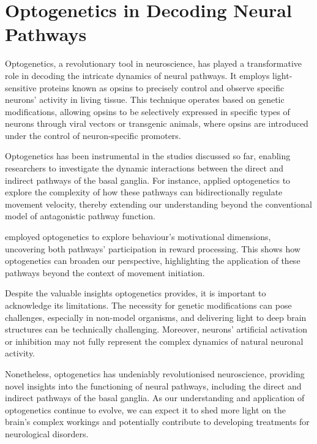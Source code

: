 \documentclass[10pt]{article}
\begin{document}
\begin{sloppypar}
  \section{Optogenetics in Decoding Neural Pathways}
  \label{sec:the-role-of-optogenetics-in-neural-pathways}

  Optogenetics, a revolutionary tool in neuroscience, has played a transformative role in decoding the intricate dynamics of neural pathways. It employs light-sensitive proteins known as opsins to precisely control and observe specific neurons’ activity in living tissue. This technique operates based on genetic modifications, allowing opsins to be selectively expressed in specific types of neurons through viral vectors or transgenic animals, where opsins are introduced under the control of neuron-specific promoters.

  Optogenetics has been instrumental in the studies discussed so far, enabling researchers to investigate the dynamic interactions between the direct and indirect pathways of the basal ganglia. For instance, \cite{yttri_opponent_2016} applied optogenetics to explore the complexity of how these pathways can bidirectionally regulate movement velocity, thereby extending our understanding beyond the conventional model of antagonistic pathway function.

  \cite{guillaumin_experimental_2021} employed optogenetics to explore behaviour’s motivational dimensions, uncovering both pathways’ participation in reward processing. This shows how optogenetics can broaden our perspective, highlighting the application of these pathways beyond the context of movement initiation.

  Despite the valuable insights optogenetics provides, it is important to acknowledge its limitations. The necessity for genetic modifications can pose challenges, especially in non-model organisms, and delivering light to deep brain structures can be technically challenging. Moreover, neurons’ artificial activation or inhibition may not fully represent the complex dynamics of natural neuronal activity.

  Nonetheless, optogenetics has undeniably revolutionised neuroscience, providing novel insights into the functioning of neural pathways, including the direct and indirect pathways of the basal ganglia. As our understanding and application of optogenetics continue to evolve, we can expect it to shed more light on the brain’s complex workings and potentially contribute to developing treatments for neurological disorders.


\end{sloppypar}
\end{document}
